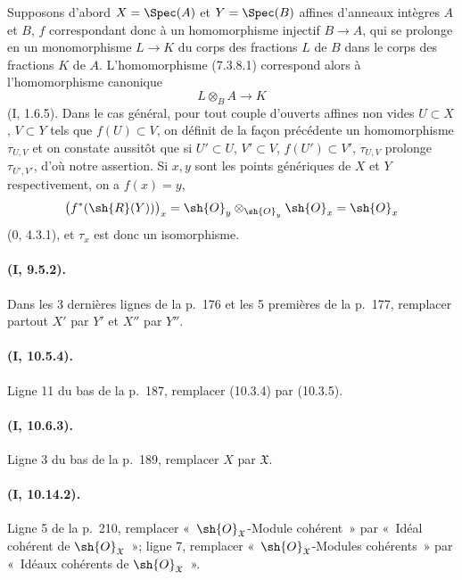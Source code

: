 Supposons d'abord $X=\Spec(A)$ et $Y=\Spec(B)$ affines d'anneaux
intègres $A$ et $B$, $f$ correspondant donc à un homomorphisme injectif
$B\to A$, qui se prolonge en un monomorphisme $L\to K$ du corps des
fractions $L$ de $B$ dans le corps des fractions $K$ de $A$.
L'homomorphisme (7.3.8.1) correspond alors à l'homomorphisme canonique
\[
  L\otimes_B A\to K
\]
(I, 1.6.5). Dans le cas général, pour tout couple d'ouverts affines non
vides $U\subset X$, $V\subset Y$ tels que $f(U)\subset V$, on définit
de la façon précédente un homomorphisme $\tau_{U,V}$ et on constate
aussitôt que si $U'\subset U$, $V'\subset V$,
$f(U')\subset V'$, $\tau_{U,V}$ prolonge $\tau_{U',V'}$, d'où notre
assertion. Si $x,y$ sont les points génériques de $X$ et $Y$
respectivement, on a $f(x)=y$,
\[
  \bigl(f^*(\sh{R}(Y))\bigr)_x
  =\sh{O}_y\otimes_{\sh{O}_y}\sh{O}_x
  =\sh{O}_x
\]
(0, 4.3.1), et $\tau_x$ est donc un isomorphisme.

\paragraph{(I, 9.5.2).}
Dans les 3 dernières lignes de la p.~176 et les 5 premières de la
p.~177, remplacer partout $X'$ par $Y'$ et $X''$ par $Y''$.

\paragraph{(I, 10.5.4).}
Ligne 11 du bas de la p.~187, remplacer (10.3.4) par (10.3.5).

\paragraph{(I, 10.6.3).}
Ligne 3 du bas de la p.~189, remplacer $X$ par $\mathfrak X$.

\paragraph{(I, 10.14.2).}
Ligne 5 de la p.~210, remplacer «~$\sh{O}_{\mathfrak X}$-Module cohérent~» par
«~Idéal cohérent de $\sh{O}_{\mathfrak X}$~»; ligne 7, remplacer
«~$\sh{O}_{\mathfrak X}$-Modules cohérents~» par «~Idéaux cohérents de
$\sh{O}_{\mathfrak X}$~».

